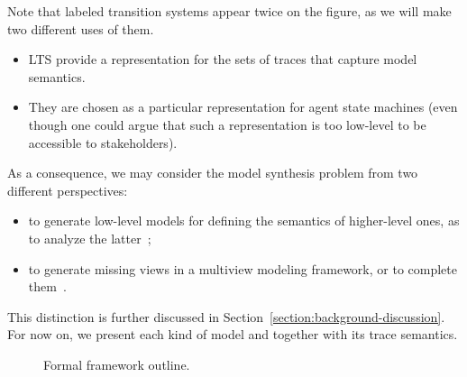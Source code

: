 Note that labeled transition systems appear twice on the figure, as we will make two different uses of them. 

\begin{itemize} 
\item LTS provide a representation for the sets of traces that capture model semantics. 
\item They are chosen as a particular representation for agent state machines (even though one could argue that such a representation is too low-level to be accessible to stakeholders).
\end{itemize}

As a consequence, we may consider the model synthesis problem from two different perspectives:

\begin{itemize}
\item to generate low-level models for defining the semantics of higher-level ones, as to analyze the latter~\cite{Magee:1997, Uchitel:2003, Damas:2009};
\item to generate missing views in a multiview modeling framework, or to complete them~\cite{VanLamsweerde:1998, Whittle:2000, Uchitel:2004, Damas:2005}.
\end{itemize}

This distinction is further discussed in Section~\ref{section:background-discussion}. For now on, we present each kind of model and together with its trace semantics.

\begin{figure}[t]\centering
  \caption{Formal framework outline.\label{image:framework}}
\end{figure}


